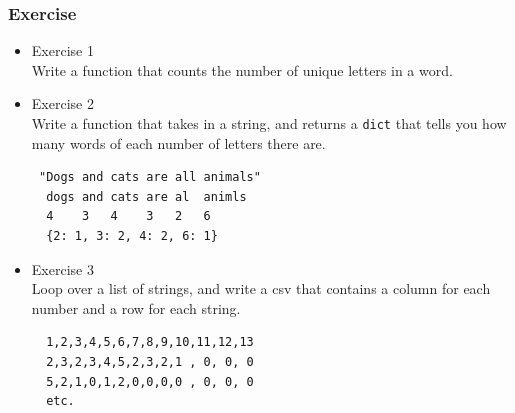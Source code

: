 \documentclass[11pt]{article}
\begin{document}
\subsubsection{Exercise}
\label{sec-2-7-4}
\begin{itemize}

\item Exercise 1\\
\label{sec-2-7-4-1}%
Write a function that counts the number of unique letters in a word.


\item Exercise 2\\
\label{sec-2-7-4-2}%
Write a function that takes in a string, and returns a \texttt{dict} that
tells you how many words of each number of letters there are.
\begin{verbatim}
 "Dogs and cats are all animals"
  dogs and cats are al  animls
  4    3   4    3   2   6
  {2: 1, 3: 2, 4: 2, 6: 1}
\end{verbatim}


\item Exercise 3\\
\label{sec-2-7-4-3}%
Loop over a list of strings, and write a csv that contains a column
for each number and a row for each string.
\begin{verbatim}
  1,2,3,4,5,6,7,8,9,10,11,12,13
  2,3,2,3,4,5,2,3,2,1 , 0, 0, 0
  5,2,1,0,1,2,0,0,0,0 , 0, 0, 0
  etc.
\end{verbatim}

\end{itemize} %
\end{document}
